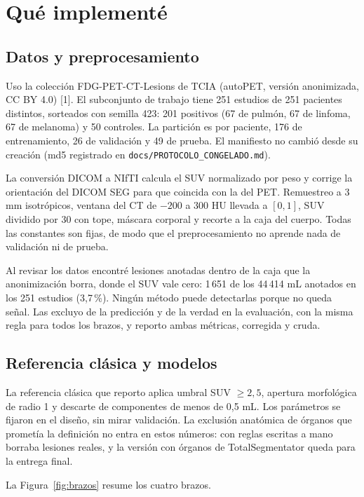\documentclass[11pt,a4paper]{article}
\begin{document}
\section{Qué implementé}

\subsection{Datos y preprocesamiento}

Uso la colección FDG-PET-CT-Lesions de TCIA (autoPET, versión anonimizada, CC BY 4.0) [1]. El subconjunto de trabajo tiene 251 estudios de 251 pacientes distintos, sorteados con semilla 423: 201 positivos (67 de pulmón, 67 de linfoma, 67 de melanoma) y 50 controles. La partición es por paciente, 176 de entrenamiento, 26 de validación y 49 de prueba. El manifiesto no cambió desde su creación (md5 registrado en \texttt{docs/PROTOCOLO\_CONGELADO.md}).

La conversión DICOM a NIfTI calcula el SUV normalizado por peso y corrige la orientación del DICOM SEG para que coincida con la del PET. Remuestreo a 3 mm isotrópicos, ventana del CT de $-200$ a 300 HU llevada a $[0,1]$, SUV dividido por 30 con tope, máscara corporal y recorte a la caja del cuerpo. Todas las constantes son fijas, de modo que el preprocesamiento no aprende nada de validación ni de prueba.

Al revisar los datos encontré lesiones anotadas dentro de la caja que la anonimización borra, donde el SUV vale cero: 1\,651 de los 44\,414 mL anotados en los 251 estudios (3,7\,\%). Ningún método puede detectarlas porque no queda señal. Las excluyo de la predicción y de la verdad en la evaluación, con la misma regla para todos los brazos, y reporto ambas métricas, corregida y cruda.

\subsection{Referencia clásica y modelos}

La referencia clásica que reporto aplica umbral SUV $\geq 2{,}5$, apertura morfológica de radio 1 y descarte de componentes de menos de 0,5 mL. Los parámetros se fijaron en el diseño, sin mirar validación. La exclusión anatómica de órganos que prometía la definición no entra en estos números: con reglas escritas a mano borraba lesiones reales, y la versión con órganos de TotalSegmentator queda para la entrega final.

La Figura~\ref{fig:brazos} resume los cuatro brazos.
\end{document}
